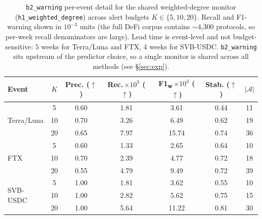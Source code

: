 \begin{table}[!htbp]
\centering
\footnotesize
\setlength{\tabcolsep}{4pt}
\caption{\texttt{b2\_warning} per-event detail for the shared weighted-degree
monitor (\texttt{h1\_weighted\_degree}) across alert budgets $K\in\{5,10,20\}$.
Recall and F1-warning shown in $10^{-3}$ units (the full DeFi corpus contains
$\sim$4{,}300 protocols, so per-week recall denominators are large). Lead
time is event-level and not budget-sensitive: $5$ weeks for Terra/Luna and
FTX, $4$ weeks for SVB-USDC. \texttt{b2\_warning} sits upstream of the
predictor choice, so a single monitor is shared across all methods
(see \S\ref{sec:exp}).}
\label{tab:b2_budget}
\begin{tabular}{l c c c c c c}
\toprule
Event & $K$ & Prec. ($\uparrow$) & Rec.\,$\times 10^{3}$ ($\uparrow$) & F1\textsubscript{w}\,$\times 10^{3}$ ($\uparrow$) & Stab. ($\uparrow$) & $|\mathcal{A}|$ \\
\midrule
\multirow{3}{*}{Terra/Luna}
& 5  & 0.60 & 1.81 & 3.61 & 0.44 & 11 \\
& 10 & 0.70 & 3.26 & 6.49 & 0.62 & 19 \\
& 20 & 0.65 & 7.97 & 15.74 & 0.74 & 36 \\
\midrule
\multirow{3}{*}{FTX}
& 5  & 0.60 & 1.33 & 2.65 & 0.64 & 10 \\
& 10 & 0.70 & 2.39 & 4.77 & 0.72 & 18 \\
& 20 & 0.55 & 4.79 & 9.49 & 0.72 & 39 \\
\midrule
\multirow{3}{*}{SVB-USDC}
& 5  & 1.00 & 1.81 & 3.62 & 0.55 & 10 \\
& 10 & 1.00 & 2.82 & 5.62 & 0.75 & 15 \\
& 20 & 1.00 & 5.64 & 11.22 & 0.81 & 30 \\
\bottomrule
\end{tabular}
\end{table}

